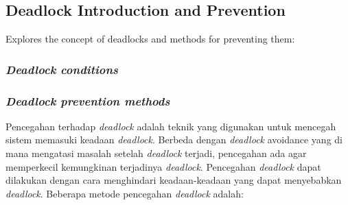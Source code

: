 \documentclass[12pt]{article}
\begin{document}
\subsection{Deadlock Introduction and Prevention}
Explores the concept of deadlocks and methods for preventing them:

\subsubsection{\textit{Deadlock conditions}}

\subsubsection{\textit{Deadlock prevention methods}}

\par  Pencegahan terhadap \textit{deadlock} adalah teknik yang digunakan untuk
mencegah sistem memasuki keadaan \textit{deadlock}. Berbeda dengan
\textit{deadlock} avoidance yang di mana mengatasi masalah setelah
\textit{deadlock} terjadi, pencegahan ada agar memperkecil kemungkinan
terjadinya \textit{deadlock}. Pencegahan \textit{deadlock} dapat dilakukan
dengan cara menghindari keadaan-keadaan yang dapat menyebabkan
\textit{deadlock}. Beberapa metode pencegahan \textit{deadlock} adalah:
\end{document}
